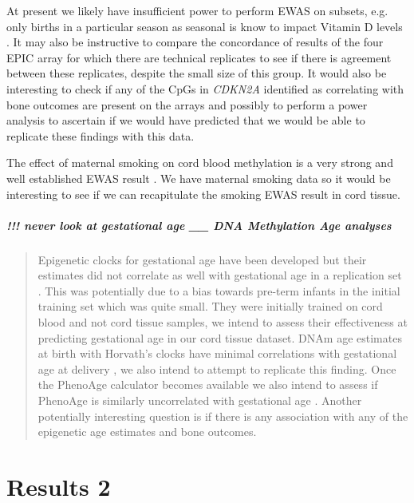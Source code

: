 \documentclass[
]{book}
\begin{document}
At present we likely have insufficient power to perform EWAS on subsets, e.g.~
only births in a particular season as seasonal is know to impact Vitamin D levels \citep{Sachs2013}.
It may also be instructive to compare the concordance of results of the four EPIC array for which there are technical replicates to see if there is agreement between these replicates, despite the small size of this group.
It would also be interesting to check if any of the CpGs in \emph{CDKN2A} identified as correlating with bone outcomes are present on the arrays and possibly to perform a power analysis to ascertain if we would have predicted that we would be able to replicate these findings with this data.

The effect of maternal smoking on cord blood methylation is a very strong and well established EWAS result \citep[\citet{Breton2017}]{Joubert2016}.
We have maternal smoking data so it would be interesting to see if we can recapitulate the smoking EWAS result in cord tissue.

\hypertarget{never-look-at-gestational-age-__-dna-methylation-age-analyses}{%
\subsubsection{!!! never look at gestational age \_\_ DNA Methylation Age analyses}\label{never-look-at-gestational-age-__-dna-methylation-age-analyses}}

\begin{quote}
Epigenetic clocks for gestational age have been developed \citep{Bohlin2016, Knight2016} but their estimates did not correlate as well with gestational age in a replication set \citep{Simpkin2017a}.
This was potentially due to a bias towards pre-term infants in the initial training set which was quite small.
They were initially trained on cord blood and not cord tissue samples, we intend to assess their effectiveness at predicting gestational age in our cord tissue dataset.
DNAm age estimates at birth with Horvath's clocks have minimal correlations with gestational age at delivery \citep{Simpkin2016, Simpkin2017}, we also intend to attempt to replicate this finding.
Once the PhenoAge calculator becomes available we also intend to assess if PhenoAge is similarly uncorrelated with gestational age \citep{Levine2018}.
Another potentially interesting question is if there is any association with any of the epigenetic age estimates and bone outcomes.
\end{quote}

\hypertarget{part-results-2}{%
\part{Results 2}\label{part-results-2}}
\end{document}
